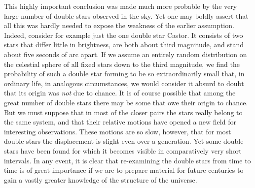 This highly important conclusion was made much more probable by the very large number of double stars observed in the sky. Yet one may boldly assert that all this was hardly needed to expose the weakness of the earlier assumption. Indeed, consider for example just the one double star Castor. It consists of two stars that differ little in brightness, are both about third magnitude, and stand about five seconds of arc apart. If we assume an entirely random distribution on the celestial sphere of all fixed stars down to the third magnitude, we find the probability of such a double star forming to be so extraordinarily small that, in ordinary life, in analogous circumstances, we would consider it absurd to doubt that its origin was \emph{not} due to chance. It is of course possible that among the great number of double stars there may be some that owe their origin to chance. But we must suppose that in most of the closer pairs the stars really belong to the same system, and that their relative motions have opened a new field for interesting observations. These motions are so slow, however, that for most double stars the displacement is slight even over a generation. Yet some double stars have been found for which it becomes visible in comparatively very short intervals. In any event, it is clear that re-examining the double stars from time to time is of great importance if we are to prepare material for future centuries to gain a vastly greater knowledge of the structure of the universe.

